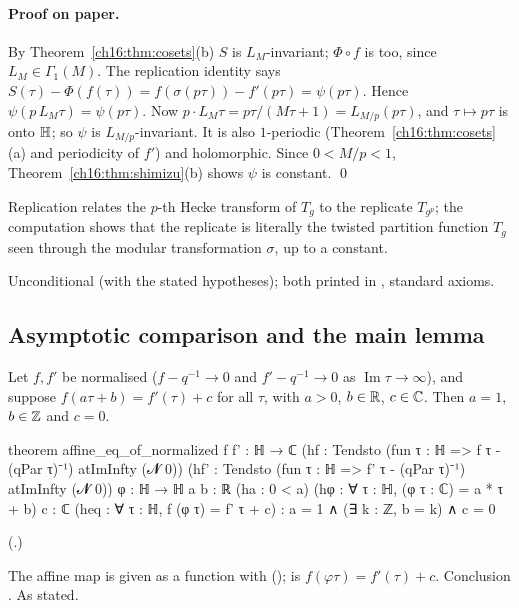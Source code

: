 \paragraph{Proof on paper.}  By Theorem~\ref{ch16:thm:cosets}(b) $S$ is $L_M$-invariant; $\Phi\circ f$ is too, since
$L_M\in\Gamma_1(M)$.  The replication identity says $S(\tau)-\Phi(f(\tau))=f(\sigma(p\tau))-f'(p\tau)=\psi(p\tau)$.  Hence
$\psi(p\,L_M\tau)=\psi(p\tau)$.  Now $p\cdot L_M\tau=p\tau/(M\tau+1)=L_{M/p}(p\tau)$, and $\tau\mapsto p\tau$ is onto
$\mathbb{H}$; so $\psi$ is $L_{M/p}$-invariant.  It is also $1$-periodic (Theorem~\ref{ch16:thm:cosets}(a) and
periodicity of $f'$) and holomorphic.  Since $0<M/p<1$, Theorem~\ref{ch16:thm:shimizu}(b) shows $\psi$ is constant. \qed
\begin{physics}
Replication relates the $p$-th Hecke transform of $T_g$ to the replicate $T_{g^p}$; the computation shows that the
replicate is literally the twisted partition function $T_g$ seen through the modular transformation $\sigma$, up to a
constant.
\end{physics}
\begin{status}
Unconditional (with the stated hypotheses); both printed in ,
standard axioms.
\end{status}

\subsection{Asymptotic comparison and the main lemma}

\begin{lemma}\label{ch16:lem:affine}
Let $f,f'$ be normalised ($f-q^{-1}\to0$ and $f'-q^{-1}\to0$ as $\operatorname{Im}\tau\to\infty$), and suppose
$f(a\tau+b)=f'(\tau)+c$ for all $\tau$, with $a>0$, $b\in\mathbb{R}$, $c\in{\mathbb{C}}$.  Then $a=1$, $b\in{\mathbb{Z}}$ and $c=0$.
\end{lemma}
\begin{leancode}
theorem affine_eq_of_normalized {f f' : ℍ → ℂ}
    (hf : Tendsto (fun τ : ℍ => f τ - (qPar τ)⁻¹) atImInfty (𝓝 0))
    (hf' : Tendsto (fun τ : ℍ => f' τ - (qPar τ)⁻¹) atImInfty (𝓝 0))
    {φ : ℍ → ℍ} {a b : ℝ} (ha : 0 < a) (hφ : ∀ τ : ℍ, (φ τ : ℂ) = a * τ + b) {c : ℂ}
    (heq : ∀ τ : ℍ, f (φ τ) = f' τ + c) :
    a = 1 ∧ (∃ k : ℤ, b = k) ∧ c = 0
\end{leancode}
(.)
\begin{dictionary}
The affine map is given as a function  with  ();  is
$f(\varphi\tau)=f'(\tau)+c$.  Conclusion .  As stated.
\end{dictionary}
